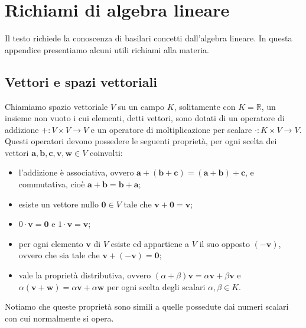\chapter{Richiami di algebra lineare}

Il testo richiede la conoscenza di basilari concetti dall'algebra lineare.
In questa appendice presentiamo alcuni utili richiami alla materia.

\section{Vettori e spazi vettoriali}

\begin{definition}
	Chiamiamo spazio vettoriale $V$ su un campo $K$, solitamente con $K=\mathbb{R}$, un insieme non vuoto i cui elementi, detti vettori, sono dotati di un operatore di addizione $+:V\times V\rightarrow V$ e un operatore di moltiplicazione per scalare $\cdot :K\times V\rightarrow V$.
  Questi operatori devono possedere le seguenti proprietà, per ogni scelta dei vettori $\mathbf{a}, \mathbf{b}, \mathbf{c}, \mathbf{v}, \mathbf{w} \in V$ coinvolti:
\begin{itemize}
	\item l'addizione è associativa, ovvero $\mathbf{a} +(\mathbf{b} +\mathbf{c}) =(\mathbf{a} +\mathbf{b}) +\mathbf{c}$, e commutativa, cioè $\mathbf{a} +\mathbf{b} =\mathbf{b} +\mathbf{a}$;
	\item esiste un vettore nullo $\mathbf{0} \in V$ tale che $\mathbf{v} +\mathbf{0} =\mathbf{v}$;
	\item $0\cdot \mathbf{v} =\mathbf{0}$ e $1\cdot \mathbf{v} =\mathbf{v}$;
	\item per ogni elemento $\mathbf{v}$ di $V$ esiste ed appartiene a $V$ il suo opposto $( -\mathbf{v})$, ovvero che sia tale che $\mathbf{v} + ( -\mathbf{v}) = \mathbf{0}$;
	\item vale la proprietà distributiva, ovvero $( \alpha +\beta )\mathbf{v} =\alpha \mathbf{v} +\beta \mathbf{v}$ e $\alpha (\mathbf{v} +\mathbf{w}) =\alpha \mathbf{v} +\alpha \mathbf{w}$ per ogni scelta degli scalari $\alpha ,\beta \in K$.
\end{itemize}
\end{definition}
Notiamo che queste proprietà sono simili a quelle possedute dai numeri scalari con cui normalmente si opera.

